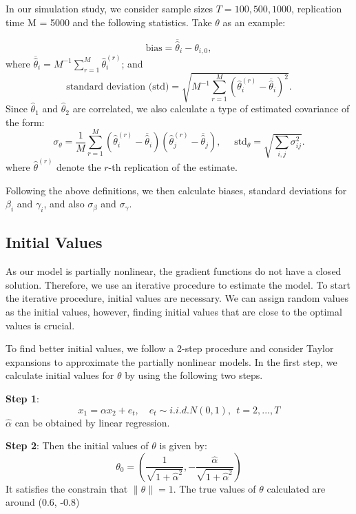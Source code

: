 \documentclass[a4paper,12pt,times,numbered,print,index]{report}
\numberwithin{equation}{section}
\begin{document}
	In our simulation study, we consider sample sizes $T = 100, 500,  1000$, replication time M = 5000 and the following statistics. Take $\theta$ as an example:
	
	\[
	\text{bias}=\overline{\widehat{\theta}}_{i}-\theta _{i,0}, 
	\]%
	where $\overline{\widehat{\theta}}_{i}=M^{-1}\sum_{r=1}^{M}\widehat{\theta}_{i}^{(r)} $; and  
	\[
	\text{standard deviation (std)}=\sqrt{M^{-1}\sum_{r=1}^{M}\left( \widehat{\theta}_{i}^{(r)}-\overline{\widehat{\theta}}_{i}\right) ^{2}}. 
	\]%
	Since $\widehat{\theta}_1$ and $\widehat{\theta}_{2}$ are correlated, we also calculate a type of estimated covariance of the form:
	\begin{equation*}
		\label{std of theta_1}
		\sigma_{\theta}=\frac{1}{M} \sum_{r=1}^{M}\left(\widehat{\theta}_{i}^{(r)}-\overline{\widehat{\theta}}_{i}\right)\left(\widehat{\theta}_{j}^{(r)}-\overline{\widehat{\theta}}_{j}\right), \quad \text { std}_{\theta} = \sqrt{\sum_{i, j} \sigma_{i j}^{2}}.
	\end{equation*}
	where 
	$\widehat{\theta}^{(r)}$ denote the $r$-th replication of the estimate.
	
	Following the above definitions, we then calculate biases, standard deviations for $\beta_i$ and $\gamma_i$, and also $\sigma_{\beta}$ and $\sigma_{\gamma}$.
	
	\subsection{Initial Values}
	
	As our model is partially nonlinear, the gradient functions do not have a closed solution. Therefore, we use an iterative procedure to estimate the model. To start the iterative procedure, initial values are necessary. We can assign random values as the initial values, however, finding initial values that are close to the optimal values is crucial.
	
	To find better initial values, we follow a 2-step procedure and consider Taylor expansions to approximate the partially nonlinear models. In the first step, we calculate initial values for $\theta$ by using the following two steps.
	
	\textbf{Step 1}: 
	$$
	x_1 = \alpha x_2 + e_t, \quad e_{t}\sim i.i.d.N\left( 0,1\right) ,\ \ t=2,...,T
	$$
	$\hat{\alpha}$ can be obtained by linear regression. 
	
	\textbf{Step 2}: 
	Then the initial values of $\theta$ is given by:
	$$
	\theta_{0} = (\dfrac{1}{\sqrt{1+\hat{\alpha}^2}}, -\dfrac{\hat{\alpha}}{\sqrt{1+\hat{\alpha}^2}})
	$$
	It satisfies the constrain that $\|\theta\| = 1$. 
	The true values of $\theta$ calculated are around (0.6, -0.8)
	
\end{document}
